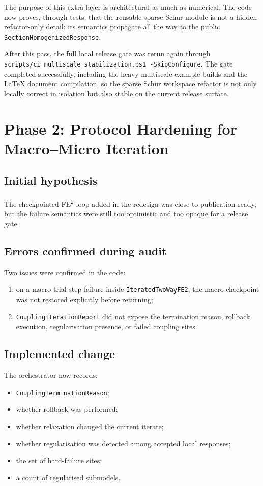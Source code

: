 The purpose of this extra layer is architectural as much as numerical.  The
code now proves, through tests, that the reusable sparse Schur module is not a
hidden refactor-only detail: its semantics propagate all the way to the public
\texttt{SectionHomogenizedResponse}.

After this pass, the full local release gate was rerun again through
\texttt{scripts/ci\_multiscale\_stabilization.ps1 -SkipConfigure}.  The gate
completed successfully, including the heavy multiscale example builds and the
\LaTeX{} document compilation, so the sparse Schur workspace refactor is not
only locally correct in isolation but also stable on the current release
surface.

\section{Phase 2: Protocol Hardening for Macro--Micro Iteration}
\label{sec:ms-stab-phase2}

\subsection{Initial hypothesis}

The checkpointed FE\textsuperscript{2} loop added in the redesign was close to
publication-ready, but the failure semantics were still too optimistic and too
opaque for a release gate.

\subsection{Errors confirmed during audit}

Two issues were confirmed in the code:
\begin{enumerate}
  \item on a macro trial-step failure inside
    \texttt{IteratedTwoWayFE2}, the macro checkpoint was not restored
    explicitly before returning;
  \item \texttt{CouplingIterationReport} did not expose the termination reason,
    rollback execution, regularisation presence, or failed coupling sites.
\end{enumerate}

\subsection{Implemented change}

The orchestrator now records:
\begin{itemize}
  \item \texttt{CouplingTerminationReason};
  \item whether rollback was performed;
  \item whether relaxation changed the current iterate;
  \item whether regularisation was detected among accepted local responses;
  \item the set of hard-failure sites;
  \item a count of regularised submodels.
\end{itemize}

